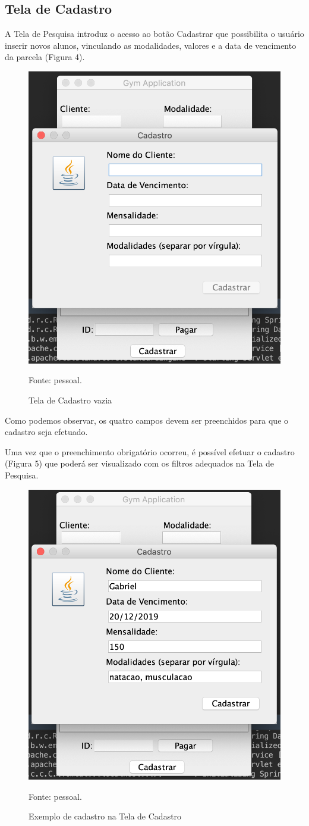 \subsection{Tela de Cadastro} 
 
 A Tela de Pesquisa introduz o acesso ao botão Cadastrar que possibilita o usuário inserir novos alunos, vinculando as modalidades, valores e a data de vencimento da parcela (Figura 4).
 
 \begin{figure}[H]
 	\centering
 	\includegraphics[width=0.5\linewidth]{images/telaCadastroVazia}
 	\caption{Tela de Cadastro vazia}
 	Fonte: pessoal.
 	\label{fig:telaCadastroVazia}
 \end{figure}
 
 Como podemos observar, os quatro campos devem ser preenchidos para que o cadastro seja efetuado.
 
 Uma vez que o preenchimento obrigatório ocorreu, é possível efetuar o cadastro (Figura 5) que poderá ser visualizado com os filtros adequados na Tela de Pesquisa.
 
 \begin{figure}[H]
 	\centering
 	\includegraphics[width=0.5\linewidth]{images/telaCadastroPreenchida}
 	\caption{Exemplo de cadastro na Tela de Cadastro}
 	Fonte: pessoal.
 	\label{fig:telaCadastroPreenchida}
 \end{figure}
 
